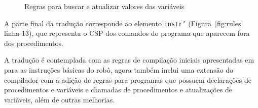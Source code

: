 \begin{figure}[!h]
\centering
\caption{Regras para buscar e atualizar valores das variáveis}

\label{fig:rules_var}
\end{figure}


A parte final da tradução corresponde ao elemento \texttt{instr'} (Figura~\ref{fig:rules} linha 13), que representa o CSP dos comandos do programa que aparecem fora dos procedimentos. 

A tradução é contemplada com as regras de compilação iniciais apresentadas em \cite{nogueira} para as instruções básicas do robô, agora também inclui uma extensão do compilador com a adição de regras para programas que possuem declarações de procedimentos e variáveis e chamadas de procedimentos e atualizações de variáveis, além de outras melhorias.

